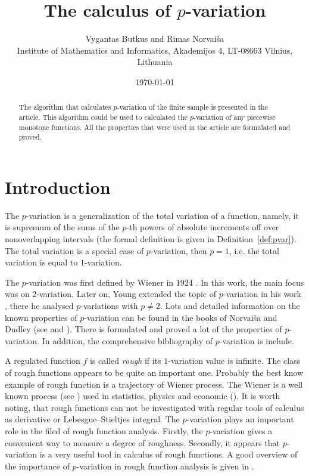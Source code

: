 \documentclass[12pt, a4paper]{article}
\title{The calculus of $p$-variation }
\author{Vygantas Butkus and Rimas Norvaiša \\
\small{Institute of Mathematics and Informatics, Akademijos 4, LT-08663 Vilnius, Lithuania}}
\date{\today}
\numberwithin{equation}{section}
\begin{document}
\maketitle

\begin{abstract}
The algorithm that calculates $p$-variation of
the finite sample is presented in the article. 
This algorithm could be used to calculated
the $p$-variation of any piecewise monotone functions.
All the properties that were used in the article 
are formulated and proved.
\end{abstract}



\section{Introduction}


The $p$-variation is a generalization of the total variation of a function,
namely, it is supremum of the sums of the $p$-th
powers of absolute increments off over nonoverlapping intervals 
(the formal definition is given in Definition~\ref{def:pvar}).
The total variation is a special case of $p$-variation, then 
$p=1$, i.e. the total variation is equal to $1$-variation.

The $p$-variation was first defined by Wiener in 1924 \cite{Wiener1924}.
In this work, the main focus was on $2$-variation. 
Later on, Young extended
the topic of $p$-variation in his work \cite{Young1936}, there 
he analysed $p$-variations with $p \neq 2$. 
Lots and detailed information on the known properties 
of $p$-variation can be found in the books of  Norvaiša and
Dudley (see \cite{DudleyNorvaisa1998} and \cite{DudleyNorvaisa1999}). 
There is formulated and proved a lot of the properties of $p$-variation.
In addition, the comprehensive bibliography of $p$-variation is include.

A regulated function $f$ is called \emph{rough}
if its $1$-variation value is infinite.
The class of rough functions appears to be quite an important one.
Probably the best know example of rough function is 
a trajectory of Wiener process. 
The Wiener is a well known process (see \cite{Karatsas1997}) 
used in statistics, physics and economic (\cite{Econ1997}).
It is worth noting, that rough functions can not be investigated 
with regular tools of calculus as derivative or Lebesgue–Stieltjes integral.
The $p$-variation plays an important role in the filed of
rough function analysis. 
Firstly, the $p$-variation gives a convenient way to measure 
a degree of roughness. 
Secondly, it appears that $p$-variation is a very useful tool 
in calculus of rough functions.
A good overview of the importance of $p$-variation in rough function
analysis is given in \cite{Norvaisa2005}.
 
\end{document}
